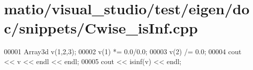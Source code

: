 \hypertarget{matio_2visual__studio_2test_2eigen_2doc_2snippets_2_cwise__is_inf_8cpp_source}{}\section{matio/visual\+\_\+studio/test/eigen/doc/snippets/\+Cwise\+\_\+is\+Inf.cpp}
\label{matio_2visual__studio_2test_2eigen_2doc_2snippets_2_cwise__is_inf_8cpp_source}

\begin{DoxyCode}
00001 Array3d v(1,2,3);
00002 v(1) *= 0.0/0.0;
00003 v(2) /= 0.0;
00004 cout << v << endl << endl;
00005 cout << isinf(v) << endl;
\end{DoxyCode}
